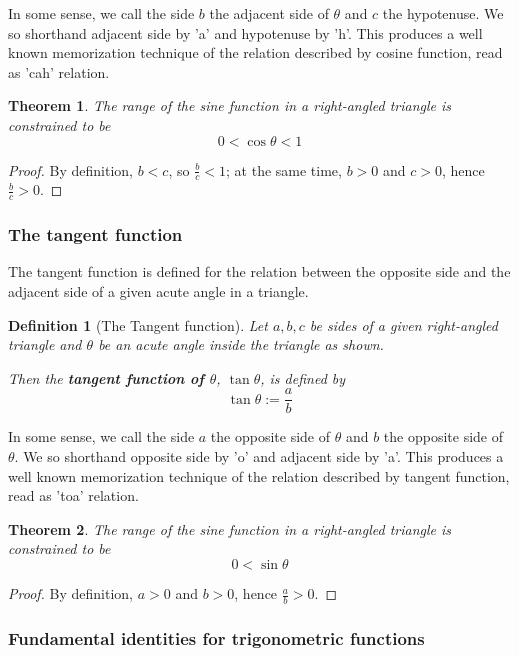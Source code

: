 \documentclass[12pt]{article}
\newtheorem{definition}{Definition}[section]
\newtheorem*{theorem}{Theorem}
\begin{document}
    In some sense, we call the side $b$ the adjacent side of $\theta$ and $c$ the hypotenuse. We so shorthand adjacent side by 'a' and hypotenuse by 'h'. This produces a well known memorization technique of the relation described by cosine function, read as 'cah' relation.

    \begin{theorem}
        The range of the sine function in a right-angled triangle is constrained to be $$0<\cos{\theta}<1$$
    \end{theorem}

    \begin{proof}
        By definition, $b<c$, so $\frac{b}{c}<1$; at the same time, $b>0$ and $c>0$, hence $\frac{b}{c}>0$.
    \end{proof}

    \subsubsection*{The tangent function}

    The tangent function is defined for the relation between the opposite side and the adjacent side of a given acute angle in a triangle.

    \begin{definition}[The Tangent function]
        Let $a,b,c$ be sides of a given right-angled triangle and $\theta$ be an acute angle inside the triangle as shown.

        Then the \textbf{tangent function of $\theta$}, $\tan{\theta}$, is defined by $$\tan{\theta}:=\frac{a}{b}$$
    \end{definition}

    In some sense, we call the side $a$ the opposite side of $\theta$ and $b$ the opposite side of $\theta$. We so shorthand opposite side by 'o' and adjacent side by 'a'. This produces a well known memorization technique of the relation described by tangent function, read as 'toa' relation.

    \begin{theorem}
        The range of the sine function in a right-angled triangle is constrained to be $$0<\sin{\theta}$$
    \end{theorem}

    \begin{proof}
        By definition, $a>0$ and $b>0$, hence $\frac{a}{b}>0$.
    \end{proof}

    \subsubsection*{Fundamental identities for trigonometric functions}
\end{document}
